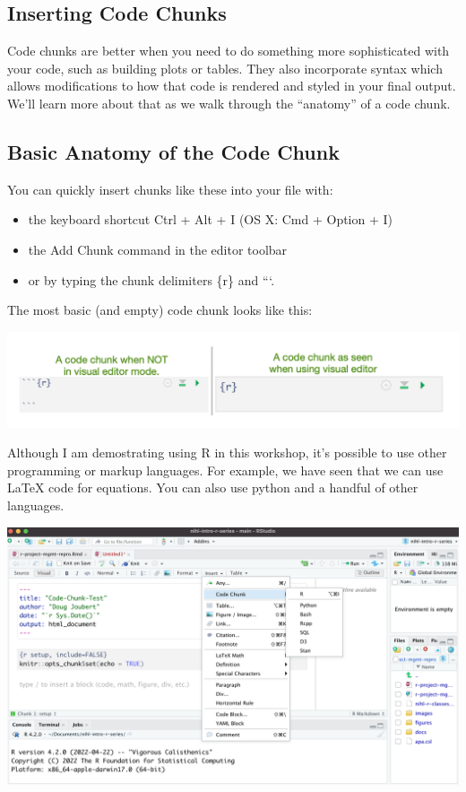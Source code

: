 \documentclass[
]{article}
\begin{document}
\hypertarget{inserting-code-chunks}{%
\subsection{Inserting Code Chunks}\label{inserting-code-chunks}}

Code chunks are better when you need to do something more sophisticated
with your code, such as building plots or tables. They also incorporate
syntax which allows modifications to how that code is rendered and
styled in your final output. We'll learn more about that as we walk
through the ``anatomy'' of a code chunk.

\hypertarget{basic-anatomy-of-the-code-chunk}{%
\subsection{Basic Anatomy of the Code
Chunk}\label{basic-anatomy-of-the-code-chunk}}

You can quickly insert chunks like these into your file with:

\begin{itemize}
\item
  the keyboard shortcut Ctrl + Alt + I (OS X: Cmd + Option + I)
\item
  the Add Chunk command in the editor toolbar
\item
  or by typing the chunk delimiters \{r\} and ```.
\end{itemize}

The most basic (and empty) code chunk looks like this:

\includegraphics[width=6.5in,height=\textheight]{images/blank-code-chunk.png}

Although I am demostrating using R in this workshop, it's possible to
use other programming or markup languages. For example, we have seen
that we can use LaTeX code for equations. You can also use python and a
handful of other languages.

\includegraphics[width=6.5in,height=\textheight]{images/code-chunk-other.png}
\end{document}
